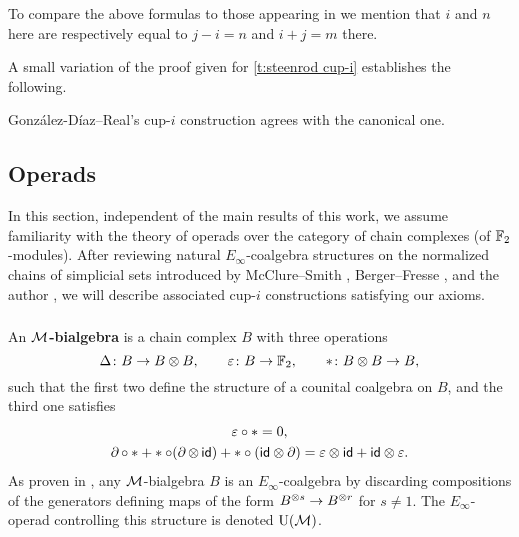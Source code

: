 \begin{remark}
	To compare the above formulas to those appearing in \cite[Corollary 3.2]{gonzalez-diaz1999steenrod} we mention that $i$ and $n$ here are respectively equal to $j-i=n$ and $i+j=m$ there.
\end{remark}

A small variation of the proof given for \cref{t:steenrod cup-i} establishes the following.

\begin{theorem}
	Gonz\'alez-D\'iaz--Real's \mbox{cup-$i$} construction agrees with the canonical one.
\end{theorem}

\subsection{Operads} \label{ss:operads}

In this section, independent of the main results of this work, we assume familiarity with the theory of operads over the category of chain complexes (of ${\mathbb{F}_2}$-modules).
After reviewing natural $E_\infty$-coalgebra structures on the normalized chains of simplicial sets introduced by McClure--Smith \cite{mcclure2003multivariable}, Berger--Fresse \cite{berger2004combinatorial}, and the author \cite{medina2020prop1,medina2021prop2}, we will describe associated \mbox{cup-$i$} constructions satisfying our axioms.


\subsubsection{}

An \textbf{$\mathcal{M}$-bialgebra} is a chain complex $B$ with three operations
\[
\Delta \colon B \to B \otimes B, \qquad
\varepsilon \colon B \to {\mathbb{F}_2}, \qquad
\ast \colon B \otimes B \to B,
\]
such that the first two define the structure of a counital coalgebra on $B$, and the third one satisfies
\begin{gather*}
\varepsilon \circ \ast = 0, \\
\operatorname{\partial} \circ \ast + \ast \circ (\operatorname{\partial} \otimes \, \mathsf{id}) + \ast \circ (\mathsf{id} \otimes \operatorname{\partial}) =
\varepsilon \otimes \mathsf{id} + \mathsf{id} \otimes \varepsilon.
\end{gather*}
As proven in \cite{medina2020prop1}, any $\mathcal{M}$-bialgebra $B$ is an $E_\infty$-coalgebra by discarding compositions of the generators defining maps of the form $B^{\otimes s} \to B^{\otimes r}$ for $s \neq 1$.
The $E_\infty$-operad controlling this structure is denoted ${\operatorname{U}(\mathcal{M})}$.

